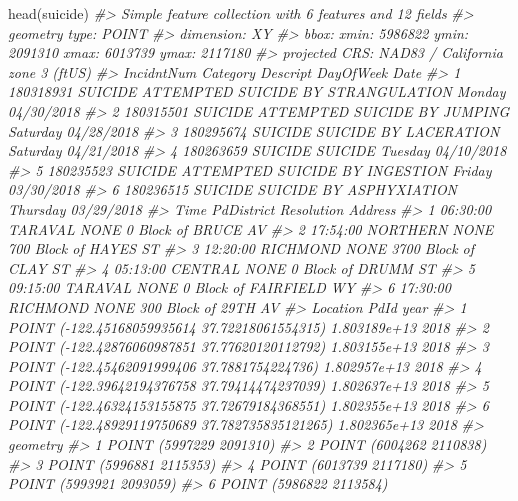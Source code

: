 \documentclass[
  12pt,
]{book}
\newenvironment{Shaded}{\begin{snugshade}}{\end{snugshade}}
\newcommand{\CommentTok}[1]{\textcolor[rgb]{0.37,0.37,0.37}{\textit{#1}}}
\newcommand{\FunctionTok}[1]{\textcolor[rgb]{0,0,0}{#1}}
\newcommand{\NormalTok}[1]{#1}
\begin{document}
\begin{Shaded}
\begin{Highlighting}[]
\FunctionTok{head}\NormalTok{(suicide)}
\CommentTok{\#\textgreater{} Simple feature collection with 6 features and 12 fields}
\CommentTok{\#\textgreater{} geometry type:  POINT}
\CommentTok{\#\textgreater{} dimension:      XY}
\CommentTok{\#\textgreater{} bbox:           xmin: 5986822 ymin: 2091310 xmax: 6013739 ymax: 2117180}
\CommentTok{\#\textgreater{} projected CRS:  NAD83 / California zone 3 (ftUS)}
\CommentTok{\#\textgreater{}   IncidntNum Category                           Descript DayOfWeek       Date}
\CommentTok{\#\textgreater{} 1  180318931  SUICIDE ATTEMPTED SUICIDE BY STRANGULATION    Monday 04/30/2018}
\CommentTok{\#\textgreater{} 2  180315501  SUICIDE       ATTEMPTED SUICIDE BY JUMPING  Saturday 04/28/2018}
\CommentTok{\#\textgreater{} 3  180295674  SUICIDE              SUICIDE BY LACERATION  Saturday 04/21/2018}
\CommentTok{\#\textgreater{} 4  180263659  SUICIDE                            SUICIDE   Tuesday 04/10/2018}
\CommentTok{\#\textgreater{} 5  180235523  SUICIDE     ATTEMPTED SUICIDE BY INGESTION    Friday 03/30/2018}
\CommentTok{\#\textgreater{} 6  180236515  SUICIDE            SUICIDE BY ASPHYXIATION  Thursday 03/29/2018}
\CommentTok{\#\textgreater{}       Time PdDistrict Resolution                 Address}
\CommentTok{\#\textgreater{} 1 06:30:00    TARAVAL       NONE     0 Block of BRUCE AV}
\CommentTok{\#\textgreater{} 2 17:54:00   NORTHERN       NONE   700 Block of HAYES ST}
\CommentTok{\#\textgreater{} 3 12:20:00   RICHMOND       NONE   3700 Block of CLAY ST}
\CommentTok{\#\textgreater{} 4 05:13:00    CENTRAL       NONE     0 Block of DRUMM ST}
\CommentTok{\#\textgreater{} 5 09:15:00    TARAVAL       NONE 0 Block of FAIRFIELD WY}
\CommentTok{\#\textgreater{} 6 17:30:00   RICHMOND       NONE    300 Block of 29TH AV}
\CommentTok{\#\textgreater{}                                         Location         PdId year}
\CommentTok{\#\textgreater{} 1  POINT ({-}122.45168059935614 37.72218061554315) 1.803189e+13 2018}
\CommentTok{\#\textgreater{} 2  POINT ({-}122.42876060987851 37.77620120112792) 1.803155e+13 2018}
\CommentTok{\#\textgreater{} 3   POINT ({-}122.45462091999406 37.7881754224736) 1.802957e+13 2018}
\CommentTok{\#\textgreater{} 4  POINT ({-}122.39642194376758 37.79414474237039) 1.802637e+13 2018}
\CommentTok{\#\textgreater{} 5  POINT ({-}122.46324153155875 37.72679184368551) 1.802355e+13 2018}
\CommentTok{\#\textgreater{} 6 POINT ({-}122.48929119750689 37.782735835121265) 1.802365e+13 2018}
\CommentTok{\#\textgreater{}                  geometry}
\CommentTok{\#\textgreater{} 1 POINT (5997229 2091310)}
\CommentTok{\#\textgreater{} 2 POINT (6004262 2110838)}
\CommentTok{\#\textgreater{} 3 POINT (5996881 2115353)}
\CommentTok{\#\textgreater{} 4 POINT (6013739 2117180)}
\CommentTok{\#\textgreater{} 5 POINT (5993921 2093059)}
\CommentTok{\#\textgreater{} 6 POINT (5986822 2113584)}
\end{Highlighting}
\end{Shaded}
\end{document}
